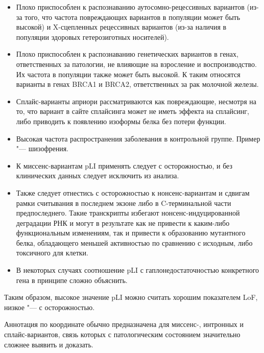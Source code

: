 \documentclass[a4paper,14pt]{extarticle}
\begin{document}
\begin{enumerate}
\begin{itemize}
\item Плохо приспособлен к распознаванию аутосомно-рецессивных вариантов (из-за того, что частота повреждающих вариантов в популяции может быть высокой) и X-сцепленных рецессивных вариантов (из-за наличия в популяции здоровых гетерозиготных носителей).
\item Плохо приспособлен к распознаванию генетических вариантов в генах, ответственных за патологии, не влияющие на взросление и воспроизводство.
Их частота в популяции также может быть высокой.
К таким относятся варианты в генах BRCA1 и BRCA2, ответственных за рак молочной железы.
\item Сплайс-варианты априори рассматриваются как повреждающие, несмотря на то, что вариант в сайте сплайсинга может не иметь эффекта на сплайсинг, либо приводить к появлению изоформы белка без потери функции.
\item Высокая частота распространения заболевания в контрольной группе.
Пример "--- шизофрения.
\item К миссенс-вариантам pLI применять следует с осторожностью, и без клинических данных следует исключить из анализа.
\item Также следует отнестись с осторожностью к нонсенс-вариантам и сдвигам рамки считывания в последнем экзоне либо в C\hyp{}терминальной части предпоследнего.
Такие транскрипты избегают нонсенс-индуцированной деградации РНК и могут в результате как не привести к каким-либо функциональным изменениям, так и привести к образованию мутантного белка, обладающего меньшей активностью по сравнению с исходным, либо токсичного для клетки.
\item В некоторых случаях соотношение pLI с гаплонедостаточностью конкретного гена в принципе сложно объяснить.
\end{itemize}

Таким образом, высокое значение pLI можно считать хорошим показателем LoF, низкое "--- с осторожностью.                                                                                                       \end{enumerate}

Аннотация по координате обычно предназначена для миссенс-, интронных и сплайс-вариантов, связь которых с патологическим состоянием значительно сложнее выявить и доказать.
\end{document}
